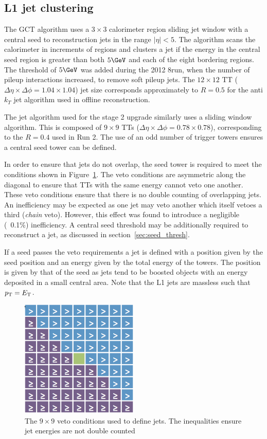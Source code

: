 \subsection{L1 jet clustering}
\label{sec:jet_algo}
The GCT algorithm uses a $3\times3$ calorimeter region sliding jet window with a central seed 
to reconstruction jets in the range $|\eta| < 5$. The algorithm scans the calorimeter in increments
of regions and clusters a jet if the energy in the central seed region is greater than 
both $5\GeV$ and each of the eight bordering regions. The threshold of $5\GeV$ was added during 
the 2012 8\TeV run, when the number of pileup interactions increased, to remove soft pileup jets.
The $12\times12$ TT ($\Delta\eta\times\Delta\phi = 1.04\times1.04$) jet size corresponds 
approximately to $R=0.5$ for the anti$k_T$ jet algorithm used in offline reconstruction.

The jet algorithm used for the stage 2 upgrade similarly uses a sliding window algorithm. This
is composed of $9\times9$ TTs ($\Delta\eta\times\Delta\phi = 0.78\times0.78$), corresponding 
to the $R=0.4$ used in Run 2. The use of an odd number of trigger towers ensures a central 
seed tower can be defined. 

In order to ensure that jets do not overlap, the seed tower is required to meet the conditions
shown in Figure~\ref{mask}. The veto conditions are asymmetric along the diagonal to ensure  
that TTs with the same energy cannot veto one another. These veto conditions ensure that there 
is no double counting of overlapping jets. An inefficiency may be expected 
as one jet may veto another which itself vetoes a third (\emph{chain} veto). However, this effect was found to 
introduce a negligible (~0.1\%) inefficiency. A central seed threshold may be 
additionally required to reconstruct a jet, as discussed in section~\ref{sec:seed_thresh}. 

If a seed passes the veto requirements a jet is defined with a position given
by the seed position and an energy given by the total energy of the towers. The position is
given by that of the seed as jets tend to be boosted objects with an energy deposited in
a small central area. Note that the L1 jets are massless such that ${p_{\text T}} = {E_{\text T}}$.

\begin{figure}
\centering
    \includegraphics[width=0.5\textwidth]{./Figures/triggerUpgrade/mask.png}
  \caption{The $9\times9$ veto conditions used to define jets. The inequalities ensure
  jet energies are not double counted}
  \label{mask}
\end{figure}

